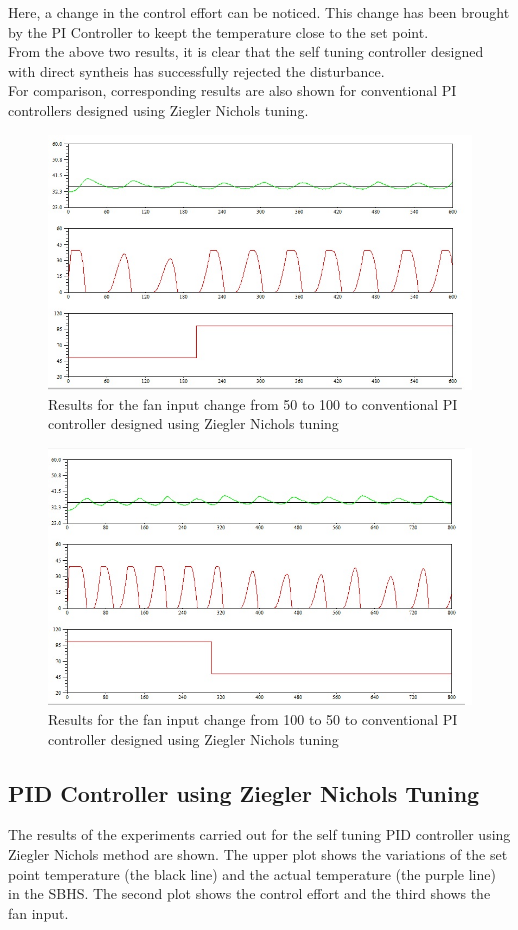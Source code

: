 Here, a change in the control effort can be noticed. This change has been brought by the PI Controller to keept the temperature close to the set point.\\
From the above two results, it is clear that the self tuning controller designed with direct syntheis has successfully 
rejected the disturbance.\\
\newpage
For comparison, corresponding results are also shown for conventional PI controllers designed using Ziegler Nichols tuning.

\begin{figure}[h]
	\centering
\includegraphics[width=.75\linewidth]{Vikas_self/report_tex/PID_results/Conventional_Tuning/Fan_disturbance/PI/step50to100.jpg}
	\caption{Results for the fan input change from 50 to 100 to conventional PI controller designed using Ziegler Nichols tuning}
\end{figure}

\begin{figure}[h]
	\centering
\includegraphics[width=.75\linewidth]{Vikas_self/report_tex/PID_results/Conventional_Tuning/Fan_disturbance/PI/step100to50.jpg}
	\caption{Results for the fan input change from 100 to 50 to conventional PI controller designed using Ziegler Nichols tuning}
\end{figure}


\newpage
\subsection{PID Controller using Ziegler Nichols Tuning}
The results of the experiments carried out for the self tuning PID controller using Ziegler Nichols method are shown. The 
upper plot shows the variations of the set point temperature (the black line) and the actual temperature (the purple line) 
in the SBHS. The second plot shows the control effort and the third shows the fan input.

